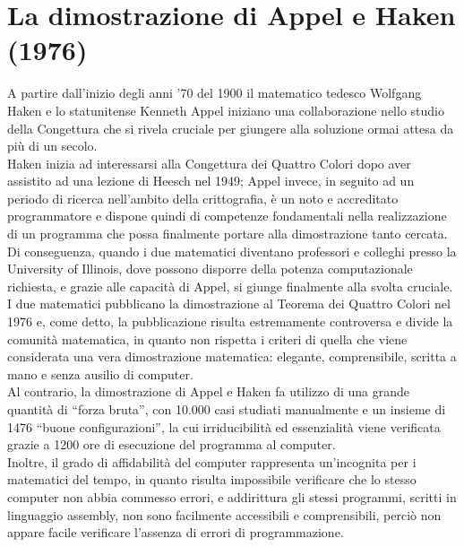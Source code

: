 \documentclass[a4paper,12pt,titlepage]{report}
\begin{document}
	 \section[La dimostrazione di Appel e Haken]{La dimostrazione di Appel e Haken (1976)}
	 A partire dall’inizio degli anni ’70 del 1900 il matematico tedesco Wolfgang Haken e lo statunitense Kenneth Appel iniziano una collaborazione nello studio della Congettura che si rivela cruciale per giungere alla soluzione ormai attesa da più di un secolo.
	 \\Haken inizia ad interessarsi alla Congettura dei Quattro Colori dopo aver assistito ad una lezione di Heesch nel 1949; Appel invece, in seguito ad un periodo di ricerca nell’ambito della crittografia, è un noto e accreditato programmatore e dispone quindi di competenze fondamentali nella realizzazione di un programma che possa finalmente portare alla dimostrazione tanto cercata. 
	 \\Di conseguenza, quando i due matematici diventano professori e colleghi presso la University of Illinois, dove possono disporre della potenza computazionale richiesta, e grazie alle capacità di Appel, si giunge finalmente alla svolta cruciale.
	 \\I due matematici pubblicano la dimostrazione al Teorema dei Quattro Colori nel 1976 {\bfseries \cite{Appel}} e, come detto, la pubblicazione risulta estremamente controversa e divide la comunità matematica, in quanto non rispetta i criteri di quella che viene considerata una vera dimostrazione matematica: elegante, comprensibile, scritta a mano e senza ausilio di computer.
	 \\Al contrario, la dimostrazione di Appel e Haken fa utilizzo di una grande quantità di “forza bruta”, con 10.000 casi studiati manualmente e un insieme di 1476 “buone configurazioni”, la cui irriducibilità ed essenzialità viene verificata grazie a 1200 ore di esecuzione del programma al computer. 
	 \\Inoltre, il grado di affidabilità del computer rappresenta un’incognita per i matematici del tempo, in quanto risulta impossibile verificare che lo stesso computer non abbia commesso errori, e addirittura gli stessi programmi, scritti in linguaggio assembly, non sono facilmente accessibili e comprensibili, perciò non appare facile verificare l’assenza di errori di programmazione.
	 
\end{document}
